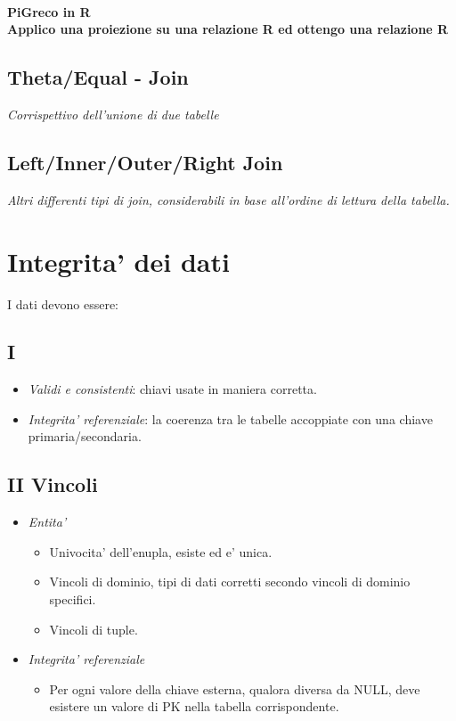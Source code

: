 \documentclass[a4paper, 12pt]{report}
\begin{document}
   \paragraph{PiGreco in R \\ Applico una proiezione su una relazione R ed ottengo una relazione R} 
   
   \subsection{Theta/Equal - Join}
   \textit{Corrispettivo dell'unione di due tabelle}
   
   \subsection{Left/Inner/Outer/Right Join}
   \textit{Altri differenti tipi di join, considerabili in base all'ordine di lettura della tabella.}
   
   \section{Integrita' dei dati}
   I dati devono essere:
   \subsection{I} 
   \begin{itemize}
       \item \textit{Validi e consistenti}: chiavi usate in maniera corretta.
       \item \textit{Integrita' referenziale}: la coerenza tra le tabelle accoppiate con una chiave primaria/secondaria.
   \end{itemize}
   \subsection{II Vincoli}
   \begin{itemize}
       \item \textit{Entita'}
       \begin{itemize}
           \item Univocita' dell'enupla, esiste ed e' unica.
           \item Vincoli di dominio, tipi di dati corretti secondo vincoli di dominio specifici.
           \item Vincoli di tuple.
       \end{itemize}
       \item \textit{Integrita' referenziale}
       \begin{itemize}
           \item Per ogni valore della chiave esterna, qualora diversa da NULL, deve esistere un valore di PK nella tabella corrispondente.
       \end{itemize}
   \end{itemize}
\end{document}
